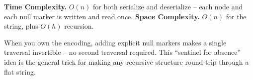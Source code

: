 \begin{complexitybox}
\textbf{Time Complexity.} $O(n)$ for both serialize and deserialize --
each node and each null marker is written and read once. \textbf{Space
Complexity.} $O(n)$ for the string, plus $O(h)$ recursion.
\end{complexitybox}

\begin{takeawaybox}
When you own the encoding, adding explicit null markers makes a single
traversal invertible -- no second traversal required. This ``sentinel for
absence'' idea is the general trick for making any recursive structure
round-trip through a flat string.
\end{takeawaybox}
